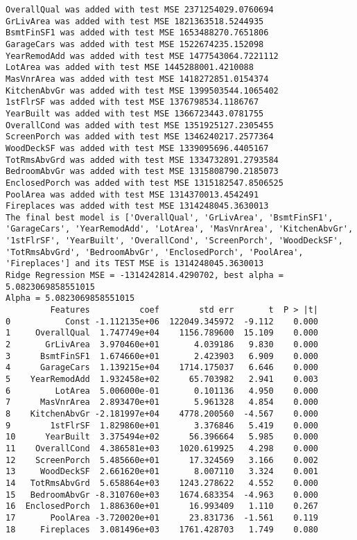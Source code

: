 \documentclass[11pt]{article}
\begin{document}
    \begin{Verbatim}[commandchars=\\\{\}]
OverallQual was added with test MSE 2371254029.0760694
GrLivArea was added with test MSE 1821363518.5244935
BsmtFinSF1 was added with test MSE 1653488270.7651806
GarageCars was added with test MSE 1522674235.152098
YearRemodAdd was added with test MSE 1477543064.7221112
LotArea was added with test MSE 1445288001.4210088
MasVnrArea was added with test MSE 1418272851.0154374
KitchenAbvGr was added with test MSE 1399503544.1065402
1stFlrSF was added with test MSE 1376798534.1186767
YearBuilt was added with test MSE 1366723443.0781755
OverallCond was added with test MSE 1351925127.2305455
ScreenPorch was added with test MSE 1346240217.2577364
WoodDeckSF was added with test MSE 1339095696.4405167
TotRmsAbvGrd was added with test MSE 1334732891.2793584
BedroomAbvGr was added with test MSE 1315808790.2185073
EnclosedPorch was added with test MSE 1315182547.8506525
PoolArea was added with test MSE 1314370013.4542491
Fireplaces was added with test MSE 1314248045.3630013
The final best model is ['OverallQual', 'GrLivArea', 'BsmtFinSF1', 'GarageCars', 'YearRemodAdd', 'LotArea', 'MasVnrArea', 'KitchenAbvGr', '1stFlrSF', 'YearBuilt', 'OverallCond', 'ScreenPorch', 'WoodDeckSF', 'TotRmsAbvGrd', 'BedroomAbvGr', 'EnclosedPorch', 'PoolArea', 'Fireplaces'] and its TEST MSE is 1314248045.3630013
Ridge Regression MSE = -1314242814.4290702, best alpha = 5.0823069858551015
Alpha = 5.0823069858551015
         Features          coef        std err       t  P > |t|
0           Const -1.112135e+06  122049.345972  -9.112    0.000
1     OverallQual  1.747749e+04    1156.789600  15.109    0.000
2       GrLivArea  3.970460e+01       4.039186   9.830    0.000
3      BsmtFinSF1  1.674660e+01       2.423903   6.909    0.000
4      GarageCars  1.139215e+04    1714.175037   6.646    0.000
5    YearRemodAdd  1.932458e+02      65.703982   2.941    0.003
6         LotArea  5.006000e-01       0.101136   4.950    0.000
7      MasVnrArea  2.893470e+01       5.961328   4.854    0.000
8    KitchenAbvGr -2.181997e+04    4778.200560  -4.567    0.000
9        1stFlrSF  1.829860e+01       3.376846   5.419    0.000
10      YearBuilt  3.375494e+02      56.396664   5.985    0.000
11    OverallCond  4.386581e+03    1020.619925   4.298    0.000
12    ScreenPorch  5.485660e+01      17.324569   3.166    0.002
13     WoodDeckSF  2.661620e+01       8.007110   3.324    0.001
14   TotRmsAbvGrd  5.658864e+03    1243.278622   4.552    0.000
15   BedroomAbvGr -8.310760e+03    1674.683354  -4.963    0.000
16  EnclosedPorch  1.886360e+01      16.993409   1.110    0.267
17       PoolArea -3.720020e+01      23.831736  -1.561    0.119
18     Fireplaces  3.081496e+03    1761.428703   1.749    0.080

    \end{Verbatim}
\end{document}
